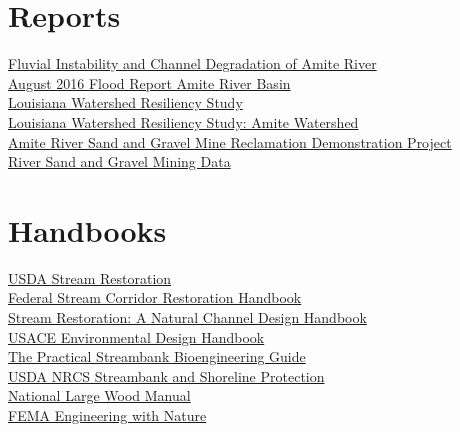 \documentclass[11pt,article,oneside]{memoir}
\begin{document}
\clearpage

\section{Reports}
%
\href{http://www.dtic.mil/dtic/tr/fulltext/u2/a471731.pdf}{Fluvial Instability and Channel Degradation of Amite River} \\
%
\href{http://www.amitebasin.org/2016Flood/August\%202016\%20Flood\%20Preliminary\%20Report.pdf}{August 2016 Flood Report Amite River Basin} \\
%
\href{https://data.femadata.com/Region6/mitigation/riskmap/lawrs/reports/LaWRS_Main\%20Report.pdf}{Louisiana Watershed Resiliency Study} \\
%
\href{https://data.femadata.com/Region6/mitigation/riskmap/lawrs/reports/Amite_Appendix.pdf}{Louisiana Watershed Resiliency Study: Amite Watershed} \\
%
\href{http://www.mvn.usace.army.mil/Portals/56/docs/PD/Projects/AmiteEcoSys/DEQ.pdf}{Amite River Sand and Gravel Mine Reclamation Demonstration Project} \\
%
\href{https://minerals.usgs.gov/mrerp/reports/Mossa-04HQGR0178/Mossa_Report1-04HQGR0178.pdf}{River Sand and Gravel Mining Data} \\

\section{Handbooks}
%
\href{http://go.usa.gov/BvNA}{USDA Stream Restoration} \\
%
\href{https://www.nrcs.usda.gov/wps/portal/nrcs/detailfull/national/water/manage/restoration/?cid=stelprdb1043244}{Federal Stream Corridor Restoration Handbook} \\
%
\href{https://semspub.epa.gov/work/01/554360.pdf}{Stream Restoration: A Natural Channel Design Handbook} \\
%
\href{http://www.mvr.usace.army.mil/Portals/48/docs/Environmental/EMP/HREP/EMP_Documents/2012\%20UMRR\%20EMP\%20Environmental\%20Design\%20Handbook\%20-\%20FINAL.pdf}{USACE Environmental Design Handbook} \\
%
\href{https://www.nrcs.usda.gov/Internet/FSE_PLANTMATERIALS/publications/idpmcpu116.pdf}{The Practical Streambank Bioengineering Guide} \\
%
\href{https://efotg.sc.egov.usda.gov/references/public/IA/Chapter-16_Streambank_and_Shoreline_Protection.pdf}{USDA NRCS Streambank and Shoreline Protection} \\
%
\href{https://coloradoewp.com/sites/coloradoewp.com/files/document/pdf/2016\%20National\%20Large\%20Wood\%20Manual.pdf}{National Large Wood Manual} \\
%
\href{https://www.fema.gov/pdf/about/regions/regionx/Engineering_With_Nature_Web.pdf}{FEMA Engineering with Nature} \\
\end{document}
